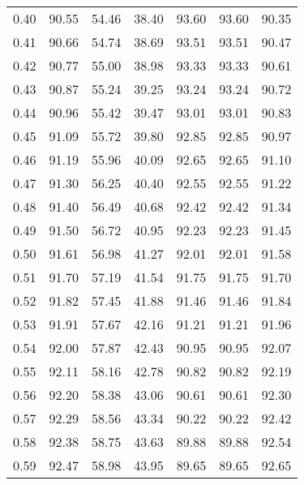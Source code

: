 \begin{tabular}{|c|c|c|c|c|c|c|}
      0.40 &     90.55 &     54.46 &      38.40 &   93.60 &      93.60 &         90.35 \\
      0.41 &     90.66 &     54.74 &      38.69 &   93.51 &      93.51 &         90.47 \\
      0.42 &     90.77 &     55.00 &      38.98 &   93.33 &      93.33 &         90.61 \\
      0.43 &     90.87 &     55.24 &      39.25 &   93.24 &      93.24 &         90.72 \\
      0.44 &     90.96 &     55.42 &      39.47 &   93.01 &      93.01 &         90.83 \\
      0.45 &     91.09 &     55.72 &      39.80 &   92.85 &      92.85 &         90.97 \\
      0.46 &     91.19 &     55.96 &      40.09 &   92.65 &      92.65 &         91.10 \\
      0.47 &     91.30 &     56.25 &      40.40 &   92.55 &      92.55 &         91.22 \\
      0.48 &     91.40 &     56.49 &      40.68 &   92.42 &      92.42 &         91.34 \\
      0.49 &     91.50 &     56.72 &      40.95 &   92.23 &      92.23 &         91.45 \\
      0.50 &     91.61 &     56.98 &      41.27 &   92.01 &      92.01 &         91.58 \\
      0.51 &     91.70 &     57.19 &      41.54 &   91.75 &      91.75 &         91.70 \\
      0.52 &     91.82 &     57.45 &      41.88 &   91.46 &      91.46 &         91.84 \\
      0.53 &     91.91 &     57.67 &      42.16 &   91.21 &      91.21 &         91.96 \\
      0.54 &     92.00 &     57.87 &      42.43 &   90.95 &      90.95 &         92.07 \\
      0.55 &     92.11 &     58.16 &      42.78 &   90.82 &      90.82 &         92.19 \\
      0.56 &     92.20 &     58.38 &      43.06 &   90.61 &      90.61 &         92.30 \\
      0.57 &     92.29 &     58.56 &      43.34 &   90.22 &      90.22 &         92.42 \\
      0.58 &     92.38 &     58.75 &      43.63 &   89.88 &      89.88 &         92.54 \\
      0.59 &     92.47 &     58.98 &      43.95 &   89.65 &      89.65 &         92.65 \\

\end{tabular}
